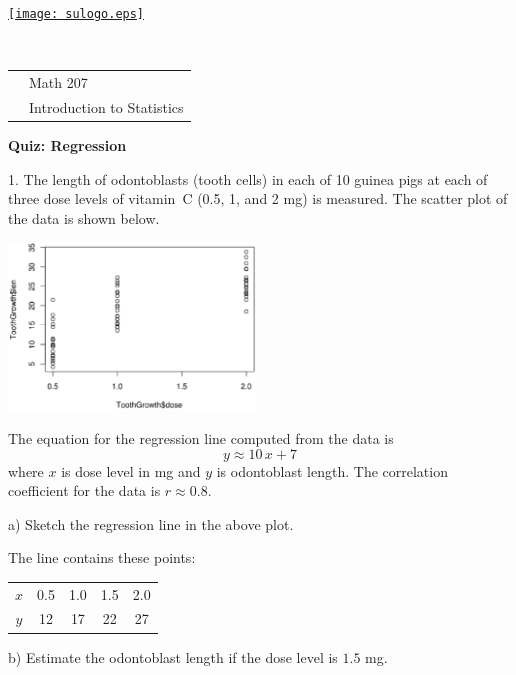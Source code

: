 \documentclass[10pt]{article}
\begin{document}
\pagestyle{empty}
\lstset{language=R, showspaces=false, showstringspaces=false}

\href{http://www.su.edu}{\texttt{[image: sulogo.eps]}}
\vspace{-1.69cm}

{{\ }\hfill\small
\begin{tabular}{cl}
& Math 207\\
& Introduction to Statistics\\
\end{tabular}
}
\setlength{\baselineskip}{1.05\baselineskip}

\begin{center}
\textbf{\large  Quiz: Regression}
\end{center}
\medskip

1. The length of odontoblasts (tooth cells) in each of 10 guinea pigs 
at each of three dose levels of vitamin~C (0.5, 1, and 2 mg) 
is measured.  The scatter plot of the data is shown below.

\begin{center}
\includegraphics[height=1.75in,bb=0 22 515 340, clip]{teeth.eps}
\end{center}
The equation for the regression line computed from the data is 
\[y \approx 10\,x + 7\]
where $x$ is dose level in mg and $y$ is odontoblast length.
The correlation coefficient for the data is $r\approx 0.8$.

\hspace{20pt} a) Sketch the regression line in the above plot.

{\color{blue}The line contains these points:\vspace{-15pt}
\begin{center}
\begin{tabular}{ccccc}
$x$ & 0.5 & 1.0 & 1.5 & 2.0\\
$y$ & 12 & 17 & 22 & 27
\end{tabular}
\end{center}}

\hspace{20pt} b) Estimate the odontoblast length if the dose level is $1.5$ mg.
\end{document}
